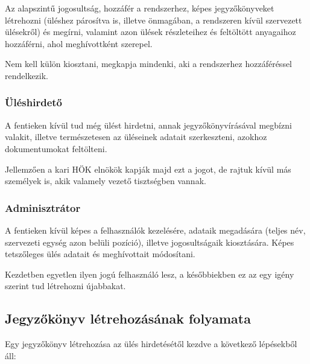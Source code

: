 \documentclass[a4paper,12pt,oneside]{report}
\begin{document}
Az alapszintű jogosultság, hozzáfér a rendszerhez, képes jegyzőkönyveket létrehozni (üléshez párosítva is, illetve önmagában, a rendszeren kívül szervezett ülésekről) és megírni, valamint azon ülések részleteihez és feltöltött anyagaihoz hozzáférni, ahol meghívottként szerepel.

Nem kell külön kiosztani, megkapja mindenki, aki a rendszerhez hozzáféréssel rendelkezik.

\subsubsection*{Üléshirdető}

A fentieken kívül tud még ülést hirdetni, annak jegyzőkönyvírásával megbízni valakit, illetve természetesen az üléseinek adatait szerkeszteni, azokhoz dokumentumokat feltölteni.

Jellemzően a kari HÖK elnökök kapják majd ezt a jogot, de rajtuk kívül más személyek is, akik valamely vezető tisztségben vannak.

\subsubsection*{Adminisztrátor}

A fentieken kívül képes a felhasználók kezelésére, adataik megadására (teljes név, szervezeti egység azon belüli pozíció), illetve jogosultságaik kiosztására. Képes tetszőleges ülés adatait és meghívottait módosítani.

Kezdetben egyetlen ilyen jogú felhasználó lesz, a későbbiekben ez az egy igény szerint tud létrehozni újabbakat.

\subsection{Jegyzőkönyv létrehozásának folyamata}

Egy jegyzőkönyv létrehozása az ülés hirdetésétől kezdve a következő lépésekből áll:
\end{document}

